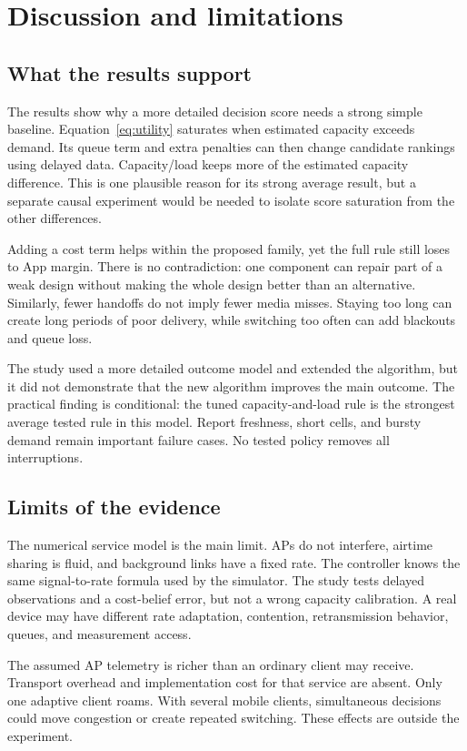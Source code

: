 \documentclass[11pt,a4paper]{article}
\begin{document}
\section{Discussion and limitations}
\subsection{What the results support}
The results show why a more detailed decision score needs a strong simple baseline. Equation~\ref{eq:utility} saturates when estimated capacity exceeds demand. Its queue term and extra penalties can then change candidate rankings using delayed data. Capacity/load keeps more of the estimated capacity difference. This is one plausible reason for its strong average result, but a separate causal experiment would be needed to isolate score saturation from the other differences.

Adding a cost term helps within the proposed family, yet the full rule still loses to App margin. There is no contradiction: one component can repair part of a weak design without making the whole design better than an alternative. Similarly, fewer handoffs do not imply fewer media misses. Staying too long can create long periods of poor delivery, while switching too often can add blackouts and queue loss.

The study used a more detailed outcome model and extended the algorithm, but it did not demonstrate that the new algorithm improves the main outcome. The practical finding is conditional: the tuned capacity-and-load rule is the strongest average tested rule in this model. Report freshness, short cells, and bursty demand remain important failure cases. No tested policy removes all interruptions.

\subsection{Limits of the evidence}
The numerical service model is the main limit. APs do not interfere, airtime sharing is fluid, and background links have a fixed rate. The controller knows the same signal-to-rate formula used by the simulator. The study tests delayed observations and a cost-belief error, but not a wrong capacity calibration. A real device may have different rate adaptation, contention, retransmission behavior, queues, and measurement access.

The assumed AP telemetry is richer than an ordinary client may receive. Transport overhead and implementation cost for that service are absent. Only one adaptive client roams. With several mobile clients, simultaneous decisions could move congestion or create repeated switching. These effects are outside the experiment.
\end{document}
